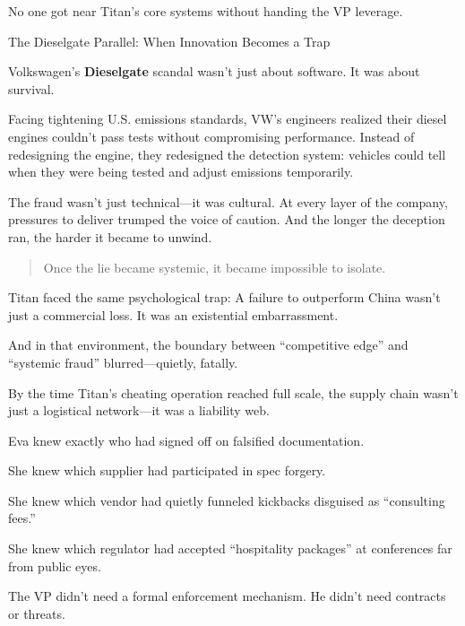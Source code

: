 No one got near Titan’s core systems without handing the VP leverage.

\medskip

\begin{PsychologySidebar}{The Dieselgate Parallel: When Innovation Becomes a Trap}

Volkswagen’s \textbf{Dieselgate} scandal wasn’t just about software.
It was about survival.

\medskip

Facing tightening U.S. emissions standards, VW’s engineers realized their diesel engines couldn’t pass tests without compromising performance. Instead of redesigning the engine, they redesigned the detection system: vehicles could tell when they were being tested and adjust emissions temporarily.

\medskip

The fraud wasn’t just technical—it was cultural.
At every layer of the company, pressures to deliver trumped the voice of caution.
And the longer the deception ran, the harder it became to unwind.

\begin{quote}
Once the lie became systemic, it became impossible to isolate.
\end{quote}

Titan faced the same psychological trap:
A failure to outperform China wasn’t just a commercial loss.
It was an existential embarrassment.

\medskip

And in that environment, the boundary between “competitive edge” and “systemic fraud” blurred—quietly, fatally.

\end{PsychologySidebar}

\medskip

By the time Titan’s cheating operation reached full scale,
the supply chain wasn’t just a logistical network—it was a liability web.

Eva knew exactly who had signed off on falsified documentation.

She knew which supplier had participated in spec forgery.

She knew which vendor had quietly funneled kickbacks disguised as “consulting fees.”

She knew which regulator had accepted “hospitality packages” at conferences far from public eyes.

The VP didn’t need a formal enforcement mechanism.
He didn’t need contracts or threats.

